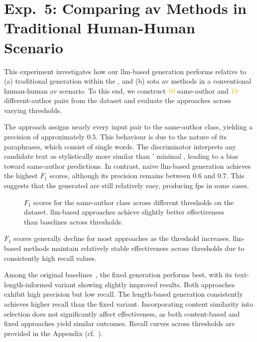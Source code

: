 \section{Exp.\ 5: Comparing \acs{av} Methods in Traditional Human-Human Scenario}
\label{sec:results_trad_av}


This experiment investigates how our \ac{llm}-based \imp{} generation performs relative to (a) traditional \imp{} generation within the \impAppr{}, and (b) \acl{sota} \ac{av} methods in a conventional human-human \ac{av} scenario. 
To this end, we construct \textcolor{orange}{10} same-author and \textcolor{orange}{10} different-author pairs from the \dataStudent{} dataset and evaluate the approaches across varying thresholds.

The \mirrorMinds{} approach assigns nearly every input pair to the same-author class, yielding a precision of approximately $0.5$. 
This behaviour is due to the nature of its paraphrases, which consist of single words. 
The discriminator interprets any candidate text as stylistically more similar than \mirrorMinds{}' minimal \imps{}, leading to a bias toward same-author predictions. 
In contrast, naive \ac{llm}-based \imp{} generation achieves the highest $F_1$ scores, although its precision remains between $0.6$ and $0.7$. 
This suggests that the generated \imps{} are still relatively easy, producing \acp{fp} in some cases.

\begin{figure}[h]
\centering
    
  \caption[Traditional \ac{av} $F_1$ scores.]{$F_1$ scores for the same-author class across different thresholds on the \dataStudent{} dataset. 
\ac{llm}-based approaches achieve slightly better effectiveness than baselines across thresholds.}
  \label{fig:human-human_f1}
\end{figure}

$F_1$ scores generally decline for most approaches as the threshold increases. 
\ac{llm}-based methods maintain relatively stable effectiveness across thresholds due to consistently high recall values. 

Among the original baselines~\citep{koppel_determining_2014}, the fixed \imp{} generation performs best, with its text-length-informed variant showing slightly improved results. 
Both approaches exhibit high precision but low recall. 
The length-based \imp{} generation consistently achieves higher recall than the fixed variant. 
Incorporating content similarity into \imp{} selection does not significantly affect effectiveness, as both content-based and fixed \imp{} approaches yield similar outcomes. 
Recall curves across thresholds are provided in the Appendix (cf.~).

